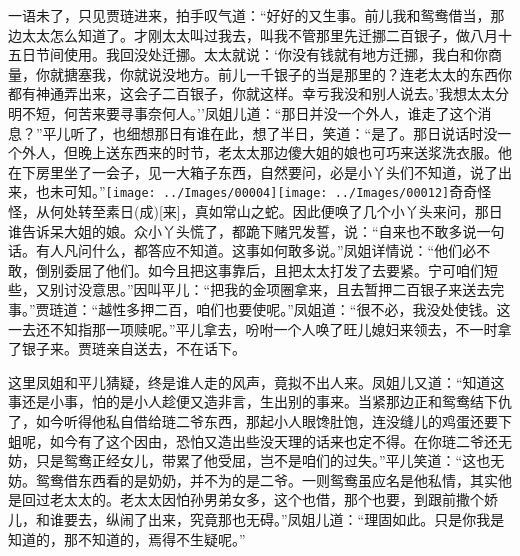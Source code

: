 一语未了，只见贾琏进来，拍手叹气道：``好好的又生事。前儿我和鸳鸯借当，那边太太怎么知道了。才刚太太叫过我去，叫我不管那里先迁挪二百银子，做八月十五日节间使用。我回没处迁挪。太太就说：`你没有钱就有地方迁挪，我白和你商量，你就搪塞我，你就说没地方。前儿一千银子的当是那里的？连老太太的东西你都有神通弄出来，这会子二百银子，你就这样。幸亏我没和别人说去。'我想太太分明不短，何苦来要寻事奈何人。''凤姐儿道：``那日并没一个外人，谁走了这个消息？''平儿听了，也细想那日有谁在此，想了半日，笑道：``是了。那日说话时没一个外人，但晚上送东西来的时节，老太太那边傻大姐的娘也可巧来送浆洗衣服。他在下房里坐了一会子，见一大箱子东西，自然要问，必是小丫头们不知道，说了出来，也未可知。''{\texttt{[image: ../Images/00004]}\texttt{[image: ../Images/00012]}\footnotesize \kaishu 奇奇怪怪，从何处转至素日{(成)}{[}来{]}，真如常山之蛇。}因此便唤了几个小丫头来问，那日谁告诉呆大姐的娘。众小丫头慌了，都跪下赌咒发誓，说：``自来也不敢多说一句话。有人凡问什么，都答应不知道。这事如何敢多说。''凤姐详情说：``他们必不敢，倒别委屈了他们。如今且把这事靠后，且把太太打发了去要紧。宁可咱们短些，又别讨没意思。''因叫平儿：``把我的金项圈拿来，且去暂押二百银子来送去完事。''贾琏道：``越性多押二百，咱们也要使呢。''凤姐道：``很不必，我没处使钱。这一去还不知指那一项赎呢。''平儿拿去，吩咐一个人唤了旺儿媳妇来领去，不一时拿了银子来。贾琏亲自送去，不在话下。

这里凤姐和平儿猜疑，终是谁人走的风声，竟拟不出人来。凤姐儿又道：``知道这事还是小事，怕的是小人趁便又造非言，生出别的事来。当紧那边正和鸳鸯结下仇了，如今听得他私自借给琏二爷东西，那起小人眼馋肚饱，连没缝儿的鸡蛋还要下蛆呢，如今有了这个因由，恐怕又造出些没天理的话来也定不得。在你琏二爷还无妨，只是鸳鸯正经女儿，带累了他受屈，岂不是咱们的过失。''平儿笑道：``这也无妨。鸳鸯借东西看的是奶奶，并不为的是二爷。一则鸳鸯虽应名是他私情，其实他是回过老太太的。老太太因怕孙男弟女多，这个也借，那个也要，到跟前撒个娇儿，和谁要去，纵闹了出来，究竟那也无碍。''凤姐儿道：``理固如此。只是你我是知道的，那不知道的，焉得不生疑呢。''

